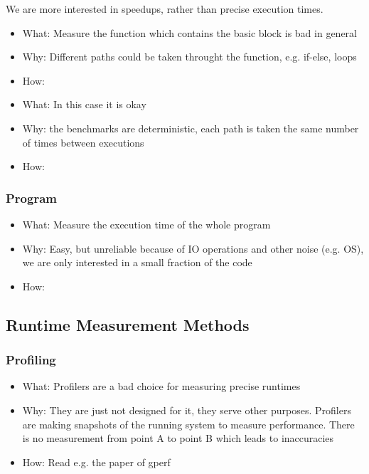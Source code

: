 We are more interested in speedups, rather than precise execution times.


\begin{itemize}
    \item What: Measure the function which contains the basic block is bad in general
    \item Why: Different paths could be taken throught the function, e.g. if-else, loops
    \item How: 
\end{itemize}
\begin{itemize}
    \item What: In this case it is okay
    \item Why: the benchmarks are deterministic, each path is taken the same number of times between executions
    \item How: 
\end{itemize}
\subsubsection{Program}
\begin{itemize}
    \item What: Measure the execution time of the whole program
    \item Why: Easy, but unreliable because of IO operations and other noise (e.g. OS), we are only interested in a small fraction of the code
    \item How: 
\end{itemize}

\subsection{Runtime Measurement Methods}
\subsubsection{Profiling}
\begin{itemize}
    \item What: Profilers are a bad choice for measuring precise runtimes
    \item Why: They are just not designed for it, they serve other purposes.
        Profilers are making snapshots of the running system to measure performance. 
        There is no measurement from point A to point B which leads to inaccuracies
    \item How: Read e.g. the paper of gperf \cite{graham1982gprof}
\end{itemize}
